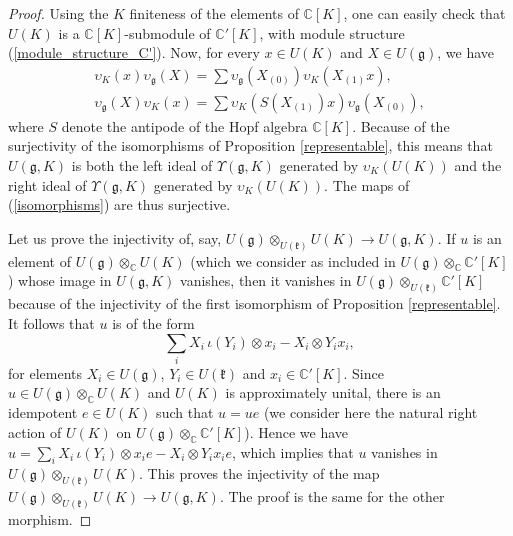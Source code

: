 \documentclass{amsart}
\theoremstyle{definition}
\begin{document}
\begin{proof}
    Using the $K$ finiteness of the elements of $\mathbb{C}[K]$, one can easily check that $U(K)$ is a $\mathbb{C}[K]$-submodule of $\mathbb{C}'[K]$, with module structure (\ref{module_structure_C'}). Now, for every $x \in U(K)$ and $X \in U(\mathfrak{g})$, we have
    \begin{gather*}
        \upsilon_K(x)\upsilon_\mathfrak{g}(X) =\sum \upsilon_\mathfrak{g}(X_{(0)})\upsilon_K( X_{(1)}x), \\ \upsilon_\mathfrak{g}(X)\upsilon_K(x) = \sum \upsilon_K( S(X_{(1)})x)\upsilon_\mathfrak{g}(X_{(0)}),
    \end{gather*}
    where $S$ denote the antipode of the Hopf algebra $\mathbb{C}[K]$. Because of the surjectivity of the isomorphisms of Proposition \ref{representable}, this means that $U(\mathfrak{g},K)$ is both the left ideal of $\Upsilon(\mathfrak{g},K)$ generated by $\upsilon_K(U(K))$ and the right ideal of $\Upsilon(\mathfrak{g},K)$ generated by $\upsilon_K(U(K))$. The maps of (\ref{isomorphisms}) are thus surjective.

    Let us prove the injectivity of, say, $U(\mathfrak{g}) \otimes_{U(\mathfrak{k})}U(K) \to U(\mathfrak{g},K)$. If $u$ is an element of $U(\mathfrak{g}) \otimes_{\mathbb{C}}U(K)$ (which we consider as included in $U(\mathfrak{g})\otimes_{\mathbb{C}}\mathbb{C}'[K]$) whose image in $U(\mathfrak{g},K)$ vanishes, then it vanishes in $U(\mathfrak{g}) \otimes_{U(\mathfrak{k})}\mathbb{C}'[K]$ because of the injectivity of the first isomorphism of Proposition \ref{representable}. It follows that $u$ is of the form \[\sum_iX_i \,\iota(Y_i) \otimes x_i - X_i \otimes Y_ix_i,\] for elements $X_i \in U(\mathfrak{g})$, $Y_i \in U(\mathfrak{k})$ and $x_i \in \mathbb{C}'[K]$. Since $u \in U(\mathfrak{g})\otimes_{\mathbb{C}}U(K)$ and $U(K)$ is approximately unital, there is an idempotent $e \in U(K)$ such that $u = ue$ (we consider here the natural right action of $U(K)$ on $U(\mathfrak{g})\otimes_{\mathbb{C}}\mathbb{C}'[K]$). Hence we have \(u = \sum_i X_i \,\iota(Y_i) \otimes x_ie - X_i \otimes Y_ix_ie\),
    which implies that $u$ vanishes in $U(\mathfrak{g}) \otimes_{U(\mathfrak{k})}U(K)$. This proves the injectivity of the map $U(\mathfrak{g}) \otimes_{U(\mathfrak{k})}U(K) \to U(\mathfrak{g},K)$. The proof is the same for the other morphism.
\end{proof}
\end{document}
